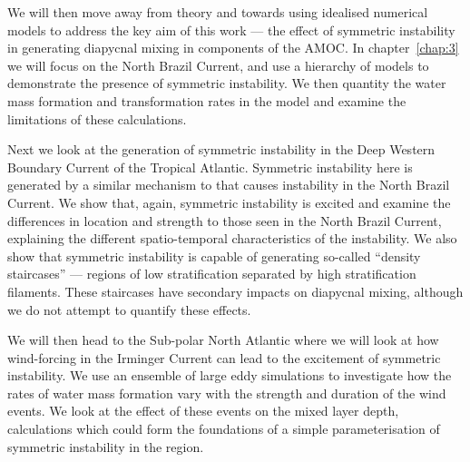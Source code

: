We will then move away from theory and towards using idealised numerical models to address the key aim of this work --- the effect of symmetric instability in generating diapycnal mixing in components of the AMOC. In chapter~\ref{chap:3} we will focus on the North Brazil Current, and use a hierarchy of models to demonstrate the presence of symmetric instability. We then quantity the water mass formation and transformation rates in the model and examine the limitations of these calculations.

Next we look at the generation of symmetric instability in the Deep Western Boundary Current of the Tropical Atlantic. Symmetric instability here is generated by a similar mechanism to that causes instability in the North Brazil Current. We show that, again, symmetric instability is excited and examine the differences in location and strength to those seen in the North Brazil Current, explaining the different spatio-temporal characteristics of the instability. We also show that symmetric instability is capable of generating so-called ``density staircases'' --- regions of low stratification separated by high stratification filaments. These staircases have secondary impacts on diapycnal mixing, although we do not attempt to quantify these effects.

We will then head to the Sub-polar North Atlantic where we will look at how wind-forcing in the Irminger Current can lead to the excitement of symmetric instability. We use an ensemble of large eddy simulations to investigate how the rates of water mass formation vary with the strength and duration of the wind events. We look at the effect of these events on the mixed layer depth, calculations which could form the foundations of a simple parameterisation of symmetric instability in the region.

